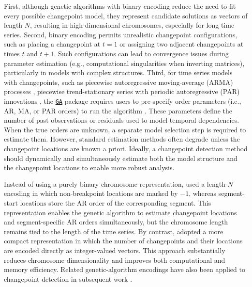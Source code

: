 First, although genetic algorithms with binary encoding reduce the need to fit every possible changepoint model, they represent candidate solutions as vectors of length \(N\), resulting in high-dimensional chromosomes, especially for long time series. Second, binary encoding permits unrealistic changepoint configurations, such as placing a changepoint at \(t=1\) or assigning two adjacent changepoints at times \(t\) and \(t+1\). Such configurations can lead to convergence issues during parameter estimation (e.g., computational singularities when inverting matrices), particularly in models with complex structures. Third, for time series models with changepoints, such as piecewise autoregressive moving-average (ARMA) processes \citep{davis2006structural, shi2022changepoint}, piecewise trend-stationary series with periodic autoregressive (PAR) innovations \citep{lu2010mdl}, the \href{https://CRAN.R-project.org/package=GA}{\texttt{GA}} package requires users to pre-specify order parameters (i.e., AR, MA, or PAR orders) to run the algorithm \citep{shibata1976selection, scrucca2017ga}. These parameters define the number of past observations or residuals used to model temporal dependencies. When the true orders are unknown, a separate model selection step is required to estimate them. However, standard estimation methods often degrade unless the changepoint locations are known a priori. Ideally, a changepoint detection method should dynamically and simultaneously estimate both the model structure and the changepoint locations to enable more robust analysis.

Instead of using a purely binary chromosome representation, \citet{davis2006structural} used a length-\(N\) encoding in which non-breakpoint locations are marked by \(-1\), whereas segment-start locations store the AR order of the corresponding segment. This representation enables the genetic algorithm to estimate changepoint locations and segment-specific AR orders simultaneously, but the chromosome length remains tied to the length of the time series. By contrast, \citet{lu2010mdl} adopted a more compact representation in which the number of changepoints and their locations are encoded directly as integer-valued vectors. This approach substantially reduces chromosome dimensionality and improves both computational and memory efficiency. Related genetic-algorithm encodings have also been applied to changepoint detection in subsequent work \citep{polushina2011change, lee2014trends, li2026MTMcpt}.

